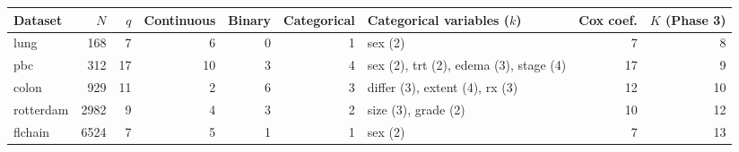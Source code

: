 \begin{tabular}{lrrrrrlrr}
  \toprule
Dataset & $N$ & $q$ & Continuous & Binary & Categorical & Categorical variables ($k$) & Cox coef. & $K$ (Phase 3) \\ 
  \midrule
lung & 168 & 7 & 6 & 0 & 1 & sex (2) & 7 & 8 \\ 
  pbc & 312 & 17 & 10 & 3 & 4 & sex (2), trt (2), edema (3), stage (4) & 17 & 9 \\ 
  colon & 929 & 11 & 2 & 6 & 3 & differ (3), extent (4), rx (3) & 12 & 10 \\ 
  rotterdam & 2982 & 9 & 4 & 3 & 2 & size (3), grade (2) & 10 & 12 \\ 
  flchain & 6524 & 7 & 5 & 1 & 1 & sex (2) & 7 & 13 \\ 
   \bottomrule
\end{tabular}
